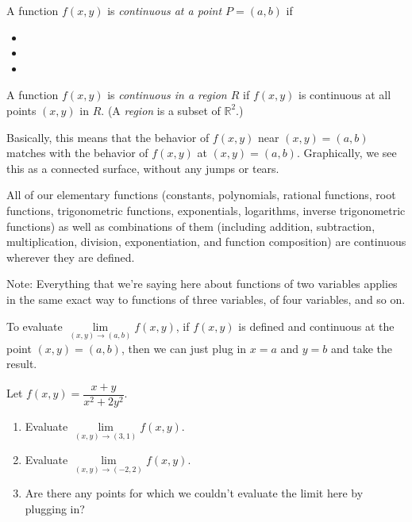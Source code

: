 \vfill

\begin{defn}
    A function $f(x,y)$ is \emph{continuous at a point $P=(a,b)$} if
    \begin{multicols}{3}
    \begin{itemize}
        \item {}
        \item {}
        \item {}
    \end{itemize}
    \end{multicols}
    A function $f(x,y)$ is \emph{continuous in a region $R$} if $f(x,y)$ is continuous at all points $(x,y)$ in $R$. (A \emph{region} is a subset of $\mathbb{R}^2$.) 
\end{defn}

Basically, this means that the behavior of $f(x,y)$ near $(x,y)=(a,b)$ matches with the behavior of $f(x,y)$ at $(x,y)=(a,b)$. Graphically, we see this as a connected surface, without any jumps or tears.

\pagebreak 

\begin{thm}
    All of our elementary functions (constants, polynomials, rational functions, root functions, trigonometric functions, exponentials, logarithms, inverse trigonometric functions) as well as combinations of them (including addition, subtraction, multiplication, division, exponentiation, and function composition) are continuous wherever they are defined.
\end{thm}

Note: Everything that we're saying here about functions of two variables applies in the same exact way to functions of three variables, of four variables, and so on.
\medskip 

To evaluate $\lim\limits_{(x,y)\to(a,b)}f(x,y)$, if $f(x,y)$ is defined and continuous at the point $(x,y)=(a,b)$, then we can just plug in $x=a$ and $y=b$ and take the result.

\begin{ex}
    Let $f(x,y)=\dfrac{x+y}{x^2+2y^2}$.
    \begin{enumerate}
        \item Evaluate $\lim\limits_{(x,y)\to(3,1)}f(x,y)$. \vfill
        \item Evaluate $\lim\limits_{(x,y)\to(-2,2)}f(x,y)$. \vfill
        \item Are there any points for which we couldn't evaluate the limit here by plugging in?\vfill
    \end{enumerate}
\end{ex}

